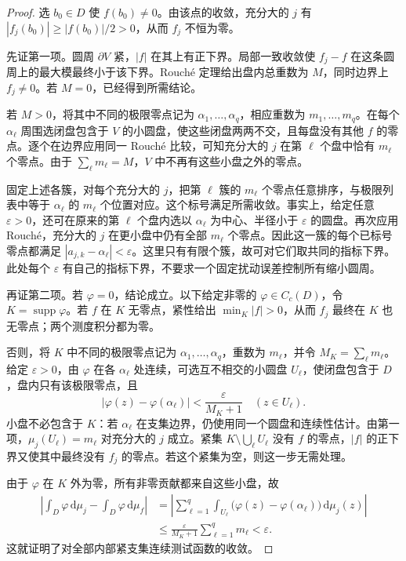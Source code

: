 \begin{proof}
选 \(b_0\in D\) 使 \(f(b_0)\ne0\)。由该点的收敛，充分大的 \(j\) 有 \(|f_j(b_0)|\ge |f(b_0)|/2>0\)，从而 \(f_j\) 不恒为零。

先证第一项。圆周 \(\partial V\) 紧，\(|f|\) 在其上有正下界。局部一致收敛使 \(f_j-f\) 在这条圆周上的最大模最终小于该下界。Rouché 定理给出盘内总重数为 \(M\)，同时边界上 \(f_j\ne0\)。若 \(M=0\)，已经得到所需结论。

若 \(M>0\)，将其中不同的极限零点记为 \(\alpha_1,\ldots,\alpha_q\)，相应重数为 \(m_1,\ldots,m_q\)。在每个 \(\alpha_\ell\) 周围选闭盘包含于 \(V\) 的小圆盘，使这些闭盘两两不交，且每盘没有其他 \(f\) 的零点。逐个在边界应用同一 Rouché 比较，可知充分大的 \(j\) 在第 \(\ell\) 个盘中恰有 \(m_\ell\) 个零点。由于 \(\sum_\ell m_\ell=M\)，\(V\) 中不再有这些小盘之外的零点。

固定上述各簇，对每个充分大的 \(j\)，把第 \(\ell\) 簇的 \(m_\ell\) 个零点任意排序，与极限列表中等于 \(\alpha_\ell\) 的 \(m_\ell\) 个位置对应。这个标号满足所需收敛。事实上，给定任意 \(\varepsilon>0\)，还可在原来的第 \(\ell\) 个盘内选以 \(\alpha_\ell\) 为中心、半径小于 \(\varepsilon\) 的圆盘。再次应用 Rouché，充分大的 \(j\) 在更小盘中仍有全部 \(m_\ell\) 个零点。因此这一簇的每个已标号零点都满足 \(|a_{j,k}-\alpha_\ell|<\varepsilon\)。这里只有有限个簇，故可对它们取共同的指标下界。此处每个 \(\varepsilon\) 有自己的指标下界，不要求一个固定扰动误差控制所有缩小圆周。

再证第二项。若 \(\varphi=0\)，结论成立。以下给定非零的 \(\varphi\in C_c(D)\)，令 \(K=\operatorname{supp}\varphi\)。若 \(f\) 在 \(K\) 无零点，紧性给出 \(\min_K|f|>0\)，从而 \(f_j\) 最终在 \(K\) 也无零点；两个测度积分都为零。

否则，将 \(K\) 中不同的极限零点记为 \(\alpha_1,\ldots,\alpha_q\)，重数为 \(m_\ell\)，并令 \(M_K=\sum_\ell m_\ell\)。给定 \(\varepsilon>0\)，由 \(\varphi\) 在各 \(\alpha_\ell\) 处连续，可选互不相交的小圆盘 \(U_\ell\)，使闭盘包含于 \(D\)，盘内只有该极限零点，且
\[
 |\varphi(z)-\varphi(\alpha_\ell)|
 <\frac{\varepsilon}{M_K+1}\quad(z\in U_\ell).
\]
小盘不必包含于 \(K\)：若 \(\alpha_\ell\) 在支集边界，仍使用同一个圆盘和连续性估计。由第一项，\(\mu_j(U_\ell)=m_\ell\) 对充分大的 \(j\) 成立。紧集 \(K\setminus\bigcup_\ell U_\ell\) 没有 \(f\) 的零点，\(|f|\) 的正下界又使其中最终没有 \(f_j\) 的零点。若这个紧集为空，则这一步无需处理。

由于 \(\varphi\) 在 \(K\) 外为零，所有非零贡献都来自这些小盘，故
\begin{align*}
 \left|\int_D\varphi\,\mathrm d\mu_j
       -\int_D\varphi\,\mathrm d\mu_f\right|
 &=\left|\sum_{\ell=1}^q\int_{U_\ell}
       \bigl(\varphi(z)-\varphi(\alpha_\ell)\bigr)\,\mathrm d\mu_j(z)\right|\\
 &\le\frac{\varepsilon}{M_K+1}\sum_{\ell=1}^qm_\ell
 <\varepsilon.
\end{align*}
这就证明了对全部内部紧支集连续测试函数的收敛。
\end{proof}

